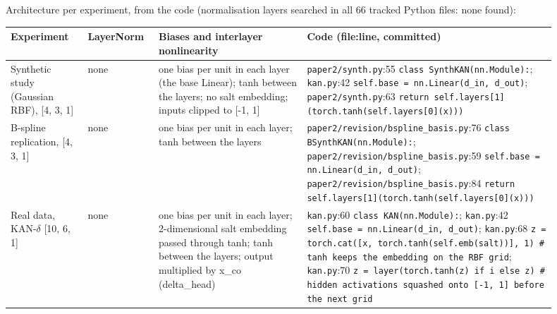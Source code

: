 \noindent Architecture per experiment, from the code (normalisation layers searched in all 66 tracked Python files: none found):
{\footnotesize\setlength{\tabcolsep}{3pt}
\begin{longtable}{R{0.13\linewidth} R{0.10\linewidth} R{0.25\linewidth} R{0.42\linewidth}}
\toprule
Experiment & LayerNorm & Biases and interlayer nonlinearity & Code (file:line, committed) \\
\midrule
\endhead
Synthetic study (Gaussian RBF), [4, 3, 1] & none & one bias per unit in each layer (the base Linear); tanh between the layers; no salt embedding; inputs clipped to [-1, 1] & \texttt{paper2/\allowbreak{}synth.py}:55 \texttt{class SynthKAN(\allowbreak{}nn.Module):}; \texttt{kan.py}:42 \texttt{self.base = nn.Linear(\allowbreak{}d\_\allowbreak{}in, \allowbreak{}d\_\allowbreak{}out)}; \texttt{paper2/\allowbreak{}synth.py}:63 \texttt{return self.layers[1](\allowbreak{}torch.tanh(\allowbreak{}self.layers[0](\allowbreak{}x)))} \\
B-spline replication, [4, 3, 1] & none & one bias per unit in each layer; tanh between the layers & \texttt{paper2/\allowbreak{}revision/\allowbreak{}bspline\_\allowbreak{}basis.py}:76 \texttt{class BSynthKAN(\allowbreak{}nn.Module):}; \texttt{paper2/\allowbreak{}revision/\allowbreak{}bspline\_\allowbreak{}basis.py}:59 \texttt{self.base = nn.Linear(\allowbreak{}d\_\allowbreak{}in, \allowbreak{}d\_\allowbreak{}out)}; \texttt{paper2/\allowbreak{}revision/\allowbreak{}bspline\_\allowbreak{}basis.py}:84 \texttt{return self.layers[1](\allowbreak{}torch.tanh(\allowbreak{}self.layers[0](\allowbreak{}x)))} \\
Real data, KAN-$\delta$ [10, 6, 1] & none & one bias per unit in each layer; 2-dimensional salt embedding passed through tanh; tanh between the layers; output multiplied by x\_co (delta\_head) & \texttt{kan.py}:60 \texttt{class KAN(\allowbreak{}nn.Module):}; \texttt{kan.py}:42 \texttt{self.base = nn.Linear(\allowbreak{}d\_\allowbreak{}in, \allowbreak{}d\_\allowbreak{}out)}; \texttt{kan.py}:68 \texttt{z = torch.cat(\allowbreak{}[x, \allowbreak{}torch.tanh(\allowbreak{}self.emb(\allowbreak{}salt))], \allowbreak{}1)  \# tanh keeps the embedding on the RBF grid}; \texttt{kan.py}:70 \texttt{z = layer(\allowbreak{}torch.tanh(\allowbreak{}z) if i else z)  \# hidden activations squashed onto [-1, \allowbreak{}1] before the next grid} \\

\end{longtable}}
